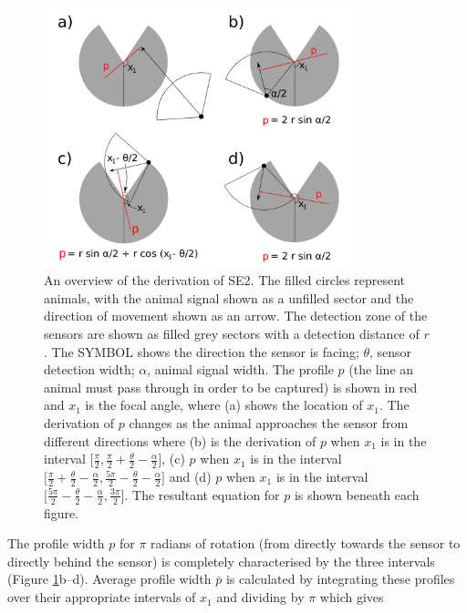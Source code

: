 \documentclass[a4paper,10pt,reqno,oneside]{amsart}
\begin{document}
\begin{figure}[t]
        \captionsetup{width=14cm}
        \captionsetup[subfigure]{labelformat=empty} %
        \centering
	\includegraphics[width=9cm]{imgs/fourIntegrals.pdf}
\caption{An overview of the derivation of SE2. The filled circles represent animals, with the animal signal shown as a unfilled sector and the direction of movement shown as an arrow. The detection zone of the sensors are shown as filled grey sectors with a detection distance of $r$. The SYMBOL shows the direction the sensor is facing;  $\theta$, sensor detection width; $\alpha$, animal signal width. The profile $p$ (the line an animal must pass through in order to be captured) is shown in red and $x_1$ is the focal angle, where (a) shows the location of $x_1$. The derivation of $p$ changes as the animal approaches the sensor from different directions where (b) is the derivation of $p$ when $x_1$ is in the interval $\lbrack\frac{\pi}{2}, \frac{\pi}{2} + \frac{\theta}{2} - \frac{\alpha}{2}\rbrack$, (c)  $p$ when $x_1$ is in the interval $\lbrack\frac{\pi}{2} + \frac{\theta}{2} - \frac{\alpha}{2}, \frac{5 \pi}{2} - \frac{\theta}{2} - \frac{\alpha}{2} \rbrack$ and (d) $p$ when $x_1$ is in the interval $\lbrack\frac{5 \pi}{2} - \frac{\theta}{2} - \frac{\alpha}{2}, \frac{3 \pi}{2}\rbrack$. The resultant equation for $p$ is shown beneath each figure.}
\label{f:fourIntegrals}
\end{figure}

The profile width $p$ for $\pi$ radians of rotation (from directly towards the sensor to directly behind the sensor) is completely characterised by the three intervals (Figure \ref{f:fourIntegrals}b--d). Average profile width $\bar{p}$ is calculated by integrating these profiles over their appropriate intervals of $x_1$ and dividing by $\pi$ which gives
\end{document}
